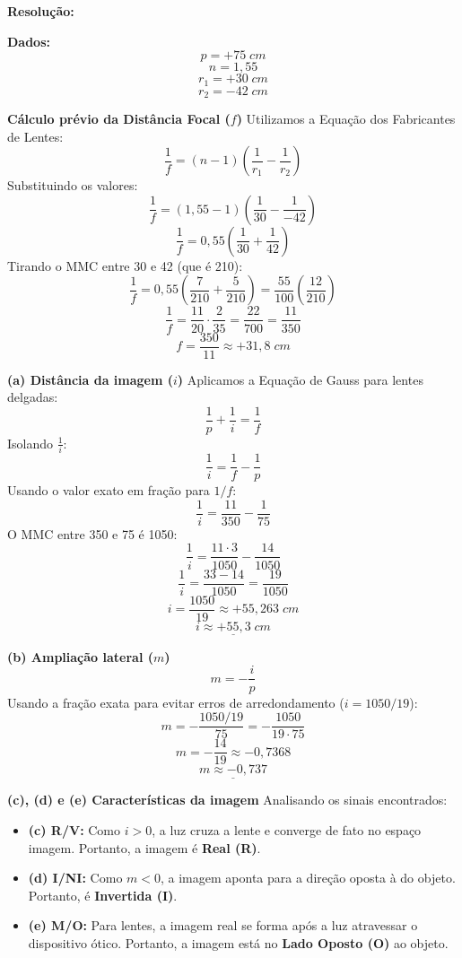 \documentclass[12pt,a4paper]{article}
\begin{document}
\textbf{Resolução:}
\vspace{0.3cm}

\textbf{Dados:}
\[p = +75\;cm\]
\[n = 1,55\]
\[r_1 = +30\;cm\]
\[r_2 = -42\;cm\]

\vspace{0.2cm}
\textbf{Cálculo prévio da Distância Focal (\(f\))}
Utilizamos a Equação dos Fabricantes de Lentes:
\[\frac{1}{f} = (n - 1) \left( \frac{1}{r_1} - \frac{1}{r_2} \right)\]
Substituindo os valores:
\[\frac{1}{f} = (1,55 - 1) \left( \frac{1}{30} - \frac{1}{-42} \right)\]
\[\frac{1}{f} = 0,55 \left( \frac{1}{30} + \frac{1}{42} \right)\]
Tirando o MMC entre 30 e 42 (que é 210):
\[\frac{1}{f} = 0,55 \left( \frac{7}{210} + \frac{5}{210} \right) = \frac{55}{100} \left( \frac{12}{210} \right)\]
\[\frac{1}{f} = \frac{11}{20} \cdot \frac{2}{35} = \frac{22}{700} = \frac{11}{350}\]
\[f = \frac{350}{11} \approx +31,8\;cm\]

\vspace{0.2cm}
\textbf{(a) Distância da imagem (\(i\))}
Aplicamos a Equação de Gauss para lentes delgadas:
\[\frac{1}{p} + \frac{1}{i} = \frac{1}{f}\]
Isolando \(\frac{1}{i}\):
\[\frac{1}{i} = \frac{1}{f} - \frac{1}{p}\]
Usando o valor exato em fração para \(1/f\):
\[\frac{1}{i} = \frac{11}{350} - \frac{1}{75}\]
O MMC entre 350 e 75 é 1050:
\[\frac{1}{i} = \frac{11 \cdot 3}{1050} - \frac{14}{1050}\]
\[\frac{1}{i} = \frac{33 - 14}{1050} = \frac{19}{1050}\]
\[i = \frac{1050}{19} \approx +55,263\;cm\]
\[\underline{i \approx +55,3\;cm}\]

\vspace{0.2cm}
\textbf{(b) Ampliação lateral (\(m\))}
\[m = -\frac{i}{p}\]
Usando a fração exata para evitar erros de arredondamento (\(i = 1050/19\)):
\[m = -\frac{1050/19}{75} = -\frac{1050}{19 \cdot 75}\]
\[m = -\frac{14}{19} \approx -0,7368\]
\[\underline{m \approx -0,737}\]

\vspace{0.2cm}
\textbf{(c), (d) e (e) Características da imagem}
Analisando os sinais encontrados:
\begin{itemize}
    \item \textbf{(c) R/V:} Como \(i > 0\), a luz cruza a lente e converge de fato no espaço imagem. Portanto, a imagem é \textbf{Real (R)}.
    \item \textbf{(d) I/NI:} Como \(m < 0\), a imagem aponta para a direção oposta à do objeto. Portanto, é \textbf{Invertida (I)}.
    \item \textbf{(e) M/O:} Para lentes, a imagem real se forma após a luz atravessar o dispositivo ótico. Portanto, a imagem está no \textbf{Lado Oposto (O)} ao objeto.
\end{itemize}
\end{document}
